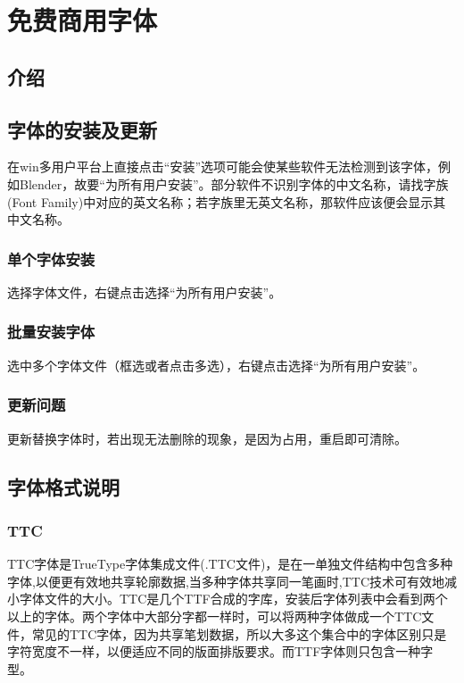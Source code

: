 \documentclass{../../PublicResources/DocClass}
\begin{document}
\maketitle
\frontmatter
{}
{}
\mainmatter

\chapter{免费商用字体}
\section{介绍}

\section{字体的安装及更新}
在win多用户平台上直接点击“安装”选项可能会使某些软件无法检测到该字体，例如Blender，故要“为所有用户安装”。部分软件不识别字体的中文名称，请找字族(Font Family)中对应的英文名称；若字族里无英文名称，那软件应该便会显示其中文名称。

\subsection{单个字体安装}
选择字体文件，右键点击选择“为所有用户安装”。

\subsection{批量安装字体}
选中多个字体文件（框选或者点击多选），右键点击选择“为所有用户安装”。

\subsection{更新问题}
更新替换字体时，若出现无法删除的现象，是因为占用，重启即可清除。

\section{字体格式说明}
\subsection{TTC}
TTC字体是TrueType字体集成文件(.TTC文件)，是在一单独文件结构中包含多种字体,以便更有效地共享轮廓数据,当多种字体共享同一笔画时,TTC技术可有效地减小字体文件的大小。TTC是几个TTF合成的字库，安装后字体列表中会看到两个以上的字体。两个字体中大部分字都一样时，可以将两种字体做成一个TTC文件，常见的TTC字体，因为共享笔划数据，所以大多这个集合中的字体区别只是字符宽度不一样，以便适应不同的版面排版要求。而TTF字体则只包含一种字型。
\end{document}
